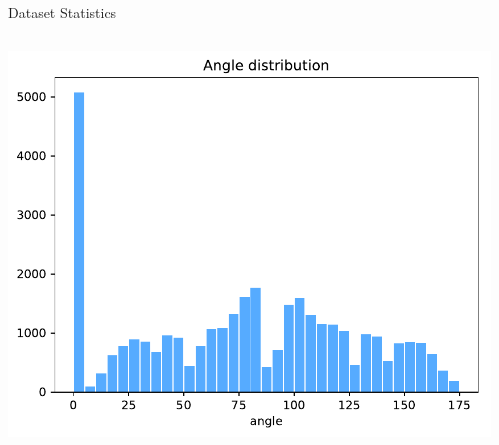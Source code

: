 \documentclass[newPxFont,fullfooter,sectionpages, progressbar]{beamer}
\begin{document}
\begin{frame}{Dataset Statistics}

	\begin{columns}
		\begin{column}{.48\linewidth}
			\includegraphics[width=\textwidth]{images/angle_hist.pdf}
		\end{column}

		\begin{column}{.48\linewidth}
		\end{column}
	\end{columns}
\end{frame}
\end{document}
